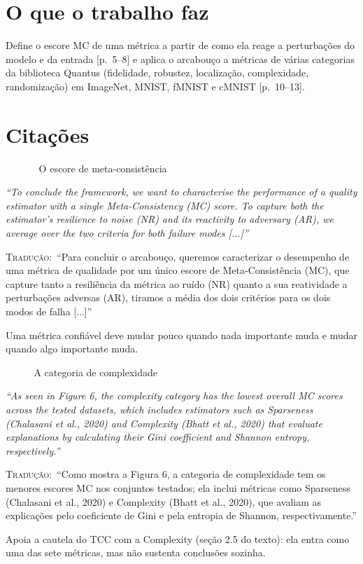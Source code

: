 \documentclass[11pt,a4paper]{article}
\newcommand{\pagechip}[1]{{\setlength{\fboxsep}{1.5pt}\colorbox{cAcc}{\textcolor{white}{\scriptsize\texttt{#1}}}}}
\newenvironment{origquote}{\par\itshape\small}{\par}
\newenvironment{tradquote}{\par\small\textsc{Tradução:}\ }{\par}
\newcommand{\explab}[1]{\par\smallskip{\small\color{cAcc}\textbf{\MakeUppercase{#1}}}\par}
\begin{document}
\section{O que o trabalho faz}
Define o escore MC de uma métrica a partir de como ela reage a perturbações do modelo e da entrada [p.~5--8] e aplica o arcabouço a métricas de várias categorias da biblioteca Quantus (fidelidade, robustez, localização, complexidade, randomização) em ImageNet, MNIST, fMNIST e cMNIST [p.~10--13].

\section{Citações}

\begin{citacard}{\pagechip{p. 8--9} O escore de meta-consistência}
\begin{origquote}“To conclude the framework, we want to characterise the performance of a quality estimator with a single Meta-Consistency (MC) score. To capture both the estimator’s resilience to noise (NR) and its reactivity to adversary (AR), we average over the two criteria for both failure modes [...]”\end{origquote}
\begin{tradquote}“Para concluir o arcabouço, queremos caracterizar o desempenho de uma métrica de qualidade por um único escore de Meta-Consistência (MC), que capture tanto a resiliência da métrica ao ruído (NR) quanto a sua reatividade a perturbações adversas (AR), tiramos a média dos dois critérios para os dois modos de falha [...]”\end{tradquote}
\explab{Explicação}
Uma métrica confiável deve mudar pouco quando nada importante muda e mudar quando algo importante muda.
\end{citacard}

\begin{citacard}{\pagechip{p. 12} A categoria de complexidade}
\begin{origquote}“As seen in Figure 6, the complexity category has the lowest overall MC scores across the tested datasets, which includes estimators such as Sparseness (Chalasani et al., 2020) and Complexity (Bhatt et al., 2020) that evaluate explanations by calculating their Gini coefficient and Shannon entropy, respectively.”\end{origquote}
\begin{tradquote}“Como mostra a Figura 6, a categoria de complexidade tem os menores escores MC nos conjuntos testados; ela inclui métricas como Sparseness (Chalasani et al., 2020) e Complexity (Bhatt et al., 2020), que avaliam as explicações pelo coeficiente de Gini e pela entropia de Shannon, respectivamente.”\end{tradquote}
\explab{Explicação}
Apoia a cautela do TCC com a Complexity (seção 2.5 do texto): ela entra como uma das sete métricas, mas não sustenta conclusões sozinha.
\end{citacard}
\end{document}
